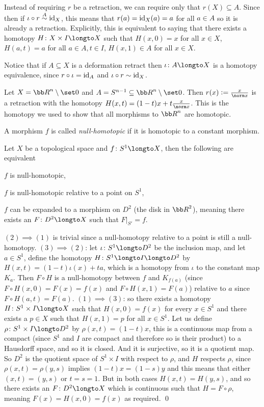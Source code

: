 \edefn

Instead of requiring $r$ be a retraction, we can require only that $r(X)\subseteq A$.
Since then if $\iota\circ r\buildrel A\over\sim{\rm id}_X$, this means that $r(a)={\rm id}_X(a)=a$ for all $a\in A$ so it is already a retraction.
Explicitly, this is equivalent to saying that there exists a homotopy $H\colon X\times I\longto X$ such that $H(x,0)=x$ for all $x\in X$, $H(a,t)=a$ for all $a\in A,t\in I$, $H(x,1)\in A$ for all $x\in X$.

Notice that if $A\subseteq X$ is a deformation retract then $\iota\colon A\longto X$ is a homotopy equivalence, since $r\circ\iota={\rm id}_A$ and $\iota\circ r\sim{\rm id}_X$.

\bexam

    Let $X={\bb R}^n\setminus\set0$ and $A=S^{n-1}\subseteq{\bb R}^n\setminus\set0$.
    Then $r(x)\coloneqq\frac x{\norm x}$ is a retraction with the homotopy $H(x,t)=(1-t)x+t\frac x{\norm x}$.
    This is the homotopy we used to show that all morphisms to ${\bb R}^n$ are homotopic.

\eexam

A morphism $f$ is called {\it null-homotopic} if it is homotopic to a constant morphism.

\bprop

    Let $X$ be a topological space and $f\colon S^1\longto X$, then the following are equivalent
    \benum
        \item $f$ is null-homotopic,
        \item $f$ is null-homotopic relative to a point on $S^1$,
        \item $f$ can be expanded to a morphism on $D^2$ (the disk in ${\bb R}^2$), meaning there exists an $F\colon D^2\longto X$ such that $F\bigr|_{S'}=f$.
    \eenum

\eprop

$(2)\implies(1)$ is trivial since a null-homotopy relative to a point is still a null-homotopy.
$(3)\implies(2)$: let $\iota\colon S^1\longto D^2$ be the inclusion map, and let $a\in S^1$, define the homotopy $H\colon S^1\longto I\longto D^2$ by $H(x,t)=(1-t)\iota(x)+ta$, which is a homotopy from
$\iota$ to the constant map $K_a$.
Then $F\circ H$ is a null-homotopy between $f$ and $K_{f(a)}$ (since $F\circ H(x,0)=F(x)=f(x)$ and $F\circ H(x,1)=F(a)$) relative to $a$ since $F\circ H(a,t)=F(a)$.
$(1)\implies(3)$: so there exists a homotopy $H\colon S^1\times I\longto X$ such that $H(x,0)=f(x)$ for every $x\in S^1$ and there exists a $p\in X$ such that $H(x,1)=p$ for all $x\in S^1$.
Let us define $\rho\colon S^1\times I\longto D^2$ by $\rho(x,t)=(1-t)x$, this is a continuous map from a compact (since $S^1$ and $I$ are compact and therefore so is their product) to a Hausdorff space, and
so it is closed.
And it is surjective, so it is a quotient map.
So $D^2$ is the quotient space of $S^1\times I$ with respect to $\rho$, and $H$ respects $\rho$, since $\rho(x,t)=\rho(y,s)$ implies $(1-t)x=(1-s)y$ and this means that either $(x,t)=(y,s)$ or $t=s=1$.
But in both cases $H(x,t)=H(y,s)$, and so there exists an $F\colon D^2\longto X$ which is continuous such that $H=F\circ\rho$, meaning $F(x)=H(x,0)=f(x)$ as required.
\qed

